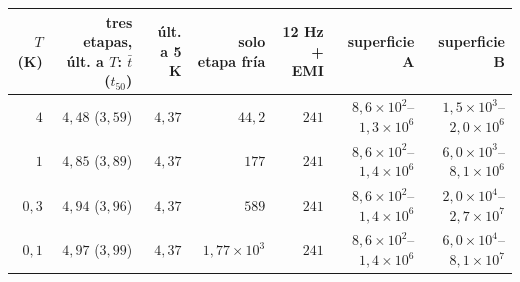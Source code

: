 \begin{tabular}{rrrrrrr}
\toprule
$T$ (K) & tres etapas, últ. a $T$: $\bar t$ ($t_{50}$) & últ. a 5 K & solo etapa fría & 12 Hz + EMI & superficie A & superficie B \\
\midrule
$4$ & $4{,}48$ ($3{,}59$) & $4{,}37$ & $44{,}2$ & $241$ & $8{,}6\times10^{2}$--$1{,}3\times10^{6}$ & $1{,}5\times10^{3}$--$2{,}0\times10^{6}$ \\
$1$ & $4{,}85$ ($3{,}89$) & $4{,}37$ & $177$ & $241$ & $8{,}6\times10^{2}$--$1{,}4\times10^{6}$ & $6{,}0\times10^{3}$--$8{,}1\times10^{6}$ \\
$0{,}3$ & $4{,}94$ ($3{,}96$) & $4{,}37$ & $589$ & $241$ & $8{,}6\times10^{2}$--$1{,}4\times10^{6}$ & $2{,}0\times10^{4}$--$2{,}7\times10^{7}$ \\
$0{,}1$ & $4{,}97$ ($3{,}99$) & $4{,}37$ & $1{,}77\times10^{3}$ & $241$ & $8{,}6\times10^{2}$--$1{,}4\times10^{6}$ & $6{,}0\times10^{4}$--$8{,}1\times10^{7}$ \\
\bottomrule
\end{tabular}
